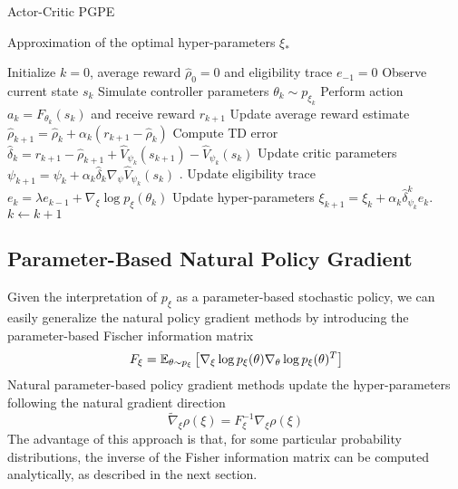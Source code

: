 \begin{algorithm}[t!]
	\caption{Actor-Critic PGPE}
	\label{algo:ACPGPE}
	\begin{algorithmic}[0]
			\Ensure Approximation of the optimal hyper-parameters $\xi_*$
			\begin{algorithmic}[1]
			\State Initialize $k = 0$, average reward $\widehat{\rho}_0 = 0$ and eligibility trace $e_{-1} = 0$
			\Repeat
				\State Observe current state $s_k$
				\State Simulate controller parameters $\theta_k \sim p_{\xi_k}$
				\State Perform action $a_k = F_{\theta_k}(s_k)$ and receive reward $r_{k+1}$
				\State Update average reward estimate $\widehat{\rho}_{k+1} = \widehat{\rho}_{k} + \alpha_k (r_{k+1} - \widehat{\rho}_{k})$
				\State Compute TD error $\widehat{\delta}_k = r_{k+1} - \widehat{\rho}_{k+1} + \widehat{V}_{\psi_k}(s_{k+1}) - \widehat{V}_{\psi_k}(s_k)$
				\State Update critic parameters $	\psi_{k+1} = \psi_k + \alpha_k \widehat{\delta}_k \nabla_\psi \widehat{V}_{\psi_k}(s_k)$ . 
				\State Update eligibility trace $e_k = \lambda e_{k-1} + \nabla_\xi\log p_\xi(\theta_k)$
				\State Update hyper-parameters $\xi_{k+1} = \xi_k + \alpha_k \widehat{\delta}_{\psi_k}^k e_k $. 
				\State $k \leftarrow k + 1$
		\end{algorithmic}
	\end{algorithmic}
\end{algorithm}  

\subsection{Parameter-Based Natural Policy Gradient}
Given the interpretation of $p_\xi$ as a parameter-based stochastic policy, we can easily generalize the natural policy gradient methods by introducing the parameter-based Fischer information matrix
\begin{equation}
	F_\xi = \E[\theta\sim p_\xi]{\nabla_\xi\log p_\xi(\theta) \nabla_\theta\log p_\xi(\theta)^T}
\end{equation}
Natural parameter-based policy gradient methods update the hyper-parameters following the natural gradient direction 
\begin{equation}
	\widetilde{\nabla}_\xi \rho(\xi) = F_\xi^{-1} \nabla_\xi \rho(\xi)
\end{equation}
The advantage of this approach is that, for some particular probability distributions, the inverse of the Fisher information matrix can be computed analytically, as described in the next section. 

